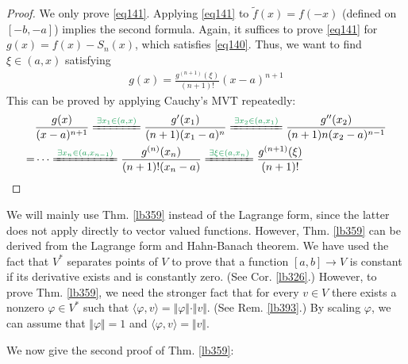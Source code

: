 \documentclass[12pt,b5paper,notitlepage]{article}
\theoremstyle{definition}
\theoremstyle{plain}
\newcommand{\wtd}{\widetilde}
\newcommand{\bk}[1]{\langle {#1}\rangle}
\numberwithin{equation}{section}
\begin{document}
\begin{proof}
We only prove \eqref{eq141}. Applying \eqref{eq141} to $\wtd f(x)=f(-x)$ (defined on $[-b,-a]$) implies the second formula. Again, it suffices to prove \eqref{eq141} for $g(x)=f(x)-S_n(x)$, which satisfies \eqref{eq140}. Thus, we want to find $\xi\in(a,x)$ satisfying
\begin{align*}
g(x)=\frac{g^{(n+1)}(\xi)}{(n+1)!}(x-a)^{n+1}
\end{align*}
This can be proved by applying Cauchy's MVT repeatedly:
\begin{align*}
&\frac{g(x)}{(x-a)^{n+1}}\xlongequal{{\color{ForestGreen}\exists x_1\in (a,x)}}\frac{g'(x_1)}{(n+1)(x_1-a)^n}\xlongequal{{\color{ForestGreen}\exists x_2\in (a,x_1)}}\frac{g''(x_2)}{(n+1)n(x_2-a)^{n-1}}\\
=&\cdots \xlongequal{{\color{ForestGreen}\exists x_n\in (a,x_{n-1})}}\frac{g^{(n)}(x_n)}{(n+1)!(x_n-a)}\xlongequal{{\color{ForestGreen}\exists \xi\in (a,x_n)}}\frac{g^{(n+1)}(\xi)}{(n+1)!}
\end{align*}
\end{proof}




We will mainly use Thm. \ref{lb359} instead of the Lagrange form, since the latter does not apply directly to vector valued functions. However, Thm. \ref{lb359} can be derived from the Lagrange form and Hahn-Banach theorem. We have used the fact that $V^*$ separates points of $V$ to prove that a function $[a,b]\rightarrow V$ is constant if its derivative exists and is constantly zero. (See Cor. \ref{lb326}.) However, to prove Thm. \ref{lb359}, we need the stronger fact that for every $v\in V$ there exists a nonzero $\varphi\in V^*$ such that $\bk{\varphi,v}=\Vert\varphi\Vert\cdot\Vert v\Vert$. (See Rem. \ref{lb393}.) By scaling $\varphi$, we can assume that $\Vert\varphi\Vert=1$ and $\bk{\varphi,v}=\Vert v\Vert$.

We now give the second proof of Thm. \ref{lb359}:


\end{document}
